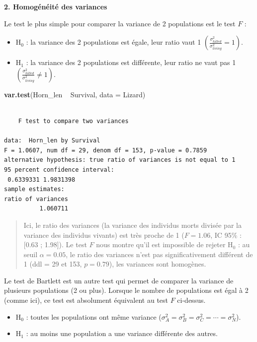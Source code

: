 \documentclass[
  a4paper,
]{article}
\newenvironment{Shaded}{\begin{snugshade}}{\end{snugshade}}
\newcommand{\DataTypeTok}[1]{\textcolor[rgb]{0.00,0.34,0.68}{#1}}
\newcommand{\KeywordTok}[1]{\textcolor[rgb]{0.12,0.11,0.11}{\textbf{#1}}}
\newcommand{\NormalTok}[1]{\textcolor[rgb]{0.12,0.11,0.11}{#1}}
\newcommand{\OperatorTok}[1]{\textcolor[rgb]{0.12,0.11,0.11}{#1}}
\newcommand{\StringTok}[1]{\textcolor[rgb]{0.75,0.01,0.01}{#1}}
\providecommand{\tightlist}{%
  \setlength{\itemsep}{0pt}\setlength{\parskip}{0pt}}
\begin{document}
\textbf{2. Homogénéité des variances}

Le test le plus simple pour comparer la variance de 2 populations est le test \(F\) :

\begin{itemize}
\tightlist
\item
  H\(_0\) : la variance des 2 populations est égale, leur ratio vaut 1 \(\left(\frac{\sigma^2_{killed}}{\sigma^2_{living}} = 1\right)\).
\item
  H\(_1\) : la variance des 2 populations est différente, leur ratio ne vaut pas 1 \(\left(\frac{\sigma^2_{killed}}{\sigma^2_{living}} \neq 1\right)\).
\end{itemize}

\begin{Shaded}
\begin{Highlighting}[]
\KeywordTok{var.test}\NormalTok{(Horn_len }\OperatorTok{~}\StringTok{ }\NormalTok{Survival, }\DataTypeTok{data =}\NormalTok{ Lizard)}
\end{Highlighting}
\end{Shaded}

\begin{verbatim}

    F test to compare two variances

data:  Horn_len by Survival
F = 1.0607, num df = 29, denom df = 153, p-value = 0.7859
alternative hypothesis: true ratio of variances is not equal to 1
95 percent confidence interval:
 0.6339331 1.9831398
sample estimates:
ratio of variances 
          1.060711 
\end{verbatim}

\begin{quote}
Ici, le ratio des variances (la variance des individus morts divisée par la variance des individus vivants) est très proche de 1 (\(F = 1.06\), IC 95\% : {[}0.63 ; 1.98{]}). Le test \(F\) nous montre qu'il est impossible de rejeter H\(_0\) : au seuil \(\alpha = 0.05\), le ratio des variances n'est pas significativement différent de 1 (ddl = 29 et 153, \(p = 0.79\)), les variances sont homogènes.
\end{quote}

Le test de Bartlett est un autre test qui permet de comparer la variance de plusieurs populations (2 ou plus). Lorsque le nombre de populations est égal à 2 (comme ici), ce test est absolument équivalent au test \(F\) ci-dessus.

\begin{itemize}
\tightlist
\item
  H\(_0\) : toutes les populations ont même variance (\(\sigma^2_A = \sigma^2_B = \sigma^2_C = \cdots = \sigma^2_N\)).
\item
  H\(_1\) : au moins une population a une variance différente des autres.
\end{itemize}
\end{document}
